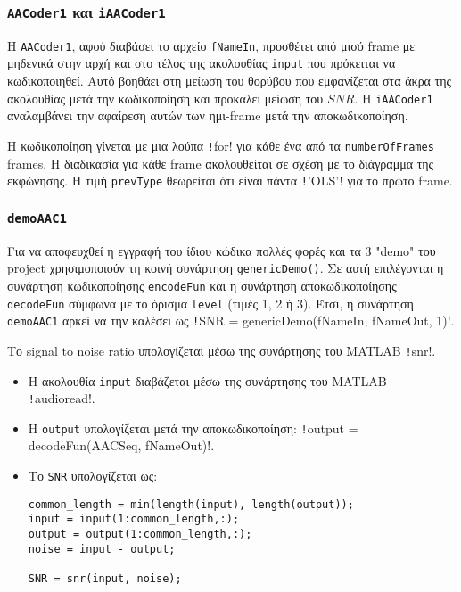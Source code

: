 \subsubsection{\texttt{AACoder1} και \texttt{iAACoder1}}\label{sub:AACoder1}
Η \texttt{AACoder1}, αφού διαβάσει το αρχείο \texttt{fNameIn}, προσθέτει από μισό frame με μηδενικά στην αρχή και στο τέλος της ακολουθίας \texttt{input} που πρόκειται να κωδικοποιηθεί.
Αυτό βοηθάει στη μείωση του θορύβου που εμφανίζεται στα άκρα της ακολουθίας μετά την κωδικοποίηση και προκαλεί μείωση του $SNR$.
Η \texttt{iAACoder1} αναλαμβάνει την αφαίρεση αυτών των ημι-frame μετά την αποκωδικοποίηση.

Η κωδικοποίηση γίνεται με μια λούπα \texttt!for! για κάθε ένα από τα \texttt{numberOfFrames} frames.
Η διαδικασία για κάθε frame ακολουθείται σε σχέση με το διάγραμμα της εκφώνησης.
Η τιμή \texttt{prevType} θεωρείται ότι είναι πάντα \texttt!'OLS'! για το πρώτο frame.

\subsubsection{\texttt{demoAAC1}}
Για να αποφευχθεί η εγγραφή του ίδιου κώδικα πολλές φορές και τα 3 "demo" του project χρησιμοποιούν τη κοινή συνάρτηση \texttt{genericDemo()}\label{genericDemo}.
Σε αυτή επιλέγονται η συνάρτηση κωδικοποίησης \texttt{encodeFun} και η συνάρτηση αποκωδικοποίησης \texttt{decodeFun} σύμφωνα με το όρισμα \texttt{level} (τιμές 1, 2 ή 3).
Έτσι, η συνάρτηση \texttt{demoAAC1} αρκεί να την καλέσει ως \texttt!SNR = genericDemo(fNameIn, fNameOut, 1)!.

Το signal to noise ratio υπολογίζεται μέσω της συνάρτησης του MATLAB \texttt!snr!.

\begin{itemize}
\item Η ακολουθία \texttt{input} διαβάζεται μέσω της συνάρτησης του MATLAB \texttt!audioread!.

\item Η \texttt{output} υπολογίζεται μετά την αποκωδικοποίηση:
\texttt!output = decodeFun(AACSeq, fNameOut)!.

\item Το \texttt{SNR} υπολογίζεται ως:
\begin{verbatim}
common_length = min(length(input), length(output));
input = input(1:common_length,:);
output = output(1:common_length,:);
noise = input - output;

SNR = snr(input, noise);
\end{verbatim}
\end{itemize}


